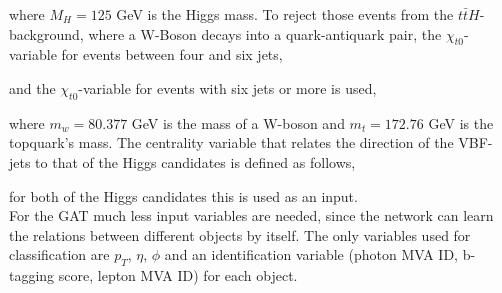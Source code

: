 
where $M_H = 125$ GeV is the Higgs mass. To reject those events from the $t \bar{t}H$-background, where a W-Boson decays into a quark-antiquark pair, the $\chi_{t0}$-variable for events between four and six jets,


and the $\chi_{t0}$-variable for events with six jets or more is used,


where $m_w=80.377$ GeV is the mass of a W-boson and $m_t=172.76$ GeV is the topquark's mass.
The centrality variable that relates the direction of the VBF-jets to that of the Higgs candidates is defined as follows,


for both of the Higgs candidates this is used as an input. \\

For the GAT much less input variables are needed, since the network can learn the relations between different objects by itself. The only variables used for classification are
$p_T$, $\eta$, $\phi$ and an identification variable (photon MVA ID, b-tagging score, lepton MVA ID) for each object.






